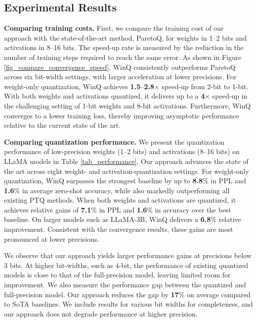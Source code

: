 \documentclass{article}
\theoremstyle{definition}
\newcommand{\acronym}{{\sc WinQ}}
\begin{document}
\subsection{Experimental Results}


\textbf{Comparing training costs.} First, we compare the training cost of our approach with the state-of-the-art method, ParetoQ, for weights in 1–2 bits and activations in 8–16 bits. The speed-up rate is measured by the reduction in the number of training steps required to reach the same error.
As shown in Figure \ref{fig_compare_convergence_speed}, \acronym{} consistently outperforms ParetoQ across six bit-width settings, with larger acceleration at lower precisions. For weight-only quantization, \acronym{} achieves \textbf{1.5}–\textbf{2.8}$\times$ speed-up from 2-bit to 1-bit. With both weights and activations quantized, it delivers up to a \textbf{4}$\times$ speed-up in the challenging setting of 1-bit weights and 8-bit activations. Furthermore, \acronym{} converges to a lower training loss, thereby improving asymptotic performance relative to the current state of the art.


\textbf{Comparing quantization performance.} We present the quantization performance of low-precision weights (1–2 bits) and activations (8–16 bits) on LLaMA models in Table \ref{tab_performance}. Our approach advances the state of the art across eight weight- and activation-quantization settings. For weight-only quantization, \acronym{} surpasses the strongest baseline by up to \textbf{8.8}\% in PPL and \textbf{1.6}\% in average zero-shot accuracy, while also markedly outperforming all existing PTQ methods.
When both weights and activations are quantized, it achieves relative gains of \textbf{7.1}\% in PPL and \textbf{1.6}\% in accuracy over the best baseline. On larger models such as LLaMA-3B, \acronym{} delivers a \textbf{6.8}\% relative improvement. Consistent with the convergence results, these gains are most pronounced at lower precisions.

We observe that our approach yields larger performance gains at precisions below 3 bits. At higher bit-widths, such as 4-bit, the performance of existing quantized models is close to that of the full-precision model, leaving limited room for improvement. 
We also measure the performance gap between the quantized and full-precision model. Our approach reduces the gap by \textbf{17}\% on average compared to SoTA baselines.
We include results for various bit widths for completeness, and our approach does not degrade performance at higher precision.
\end{document}

